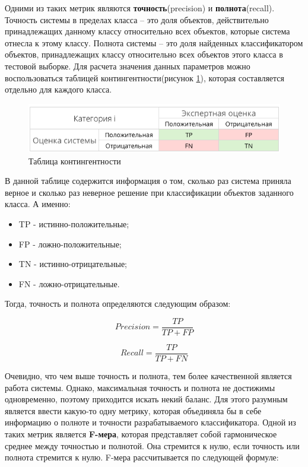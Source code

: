 Одними из таких метрик являются \textbf{точность}(precision) и \textbf{полнота}(recall).
Точность системы в пределах класса – это доля объектов, действительно принадлежащих данному классу относительно всех объектов, которые система отнесла к этому классу. Полнота системы – это доля найденных классификатором объектов, принадлежащих классу относительно всех объектов этого класса в тестовой выборке. Для расчета значения данных параметров можно воспользоваться таблицей контингентности(рисунок \ref{anal:prec-rec-table}), которая составляется отдельно для каждого класса.

\begin{figure}[h!]
	\centering
	\includegraphics[width=\textwidth]{inc/img/prec-rec-table.png}
	\caption{Таблица контингентности}
	\label{anal:prec-rec-table}
\end{figure}

\newpage
В данной таблице содержится информация о том, сколько раз система приняла верное и сколько раз неверное решение при классификации объектов заданного класса. А именно:

\begin{itemize}
	\item TP - истинно-положительные;
	\item FP - ложно-положительные;
	\item TN - истинно-отрицательные;
	\item FN - ложно-отрицательные.
\end{itemize}

Тогда, точность и полнота определяются следующим образом:

\begin{equation}
Precision = \frac{TP}{TP+FP} 
\end{equation}

\begin{equation}
Recall = \frac{TP}{TP+FN}
\end{equation}

\vspace{\baselineskip}
Очевидно, что чем выше точность и полнота, тем более качественной является работа системы. Однако, максимальная точность и полнота не достижимы одновременно, поэтому приходится искать некий баланс. Для этого разумным является ввести какую-то одну метрику, которая объединяла бы в себе информацию о полноте и точности разрабатываемого классификатора. Одной из таких метрик является \textbf{F-мера}, которая представляет собой гармоническое среднее \cite{Posobie} между точностью и полнотой. Она стремится к нулю, если точность или полнота стремится к нулю. F-мера рассчитывается по следующей формуле:

